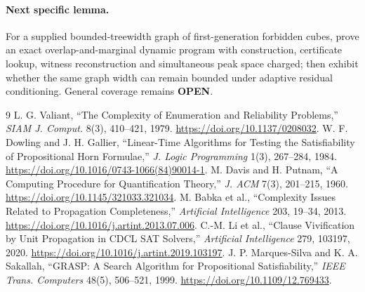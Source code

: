 \documentclass[11pt]{article}
\newcommand{\OPEN}{\textbf{OPEN}}
\begin{document}
\paragraph{Next specific lemma.}
For a supplied bounded-treewidth graph of first-generation forbidden cubes,
prove an exact overlap-and-marginal dynamic program with construction,
certificate lookup, witness reconstruction and simultaneous peak space
charged; then exhibit whether the same graph width can remain bounded under
adaptive residual conditioning.  General coverage remains \OPEN.

\begin{thebibliography}{9}
L. G. Valiant, ``The Complexity of Enumeration and Reliability Problems,''
\emph{SIAM J. Comput.} 8(3), 410--421, 1979.
\url{https://doi.org/10.1137/0208032}.
W. F. Dowling and J. H. Gallier, ``Linear-Time Algorithms for Testing the
Satisfiability of Propositional Horn Formulae,'' \emph{J. Logic Programming}
1(3), 267--284, 1984. \url{https://doi.org/10.1016/0743-1066(84)90014-1}.
M. Davis and H. Putnam, ``A Computing Procedure for Quantification Theory,''
\emph{J. ACM} 7(3), 201--215, 1960.
\url{https://doi.org/10.1145/321033.321034}.
M. Babka et al., ``Complexity Issues Related to Propagation Completeness,''
\emph{Artificial Intelligence} 203, 19--34, 2013.
\url{https://doi.org/10.1016/j.artint.2013.07.006}.
C.-M. Li et al., ``Clause Vivification by Unit Propagation in CDCL SAT
Solvers,'' \emph{Artificial Intelligence} 279, 103197, 2020.
\url{https://doi.org/10.1016/j.artint.2019.103197}.
J. P. Marques-Silva and K. A. Sakallah, ``GRASP: A Search Algorithm for
Propositional Satisfiability,'' \emph{IEEE Trans. Computers} 48(5), 506--521,
1999. \url{https://doi.org/10.1109/12.769433}.
\end{thebibliography}
\end{document}

